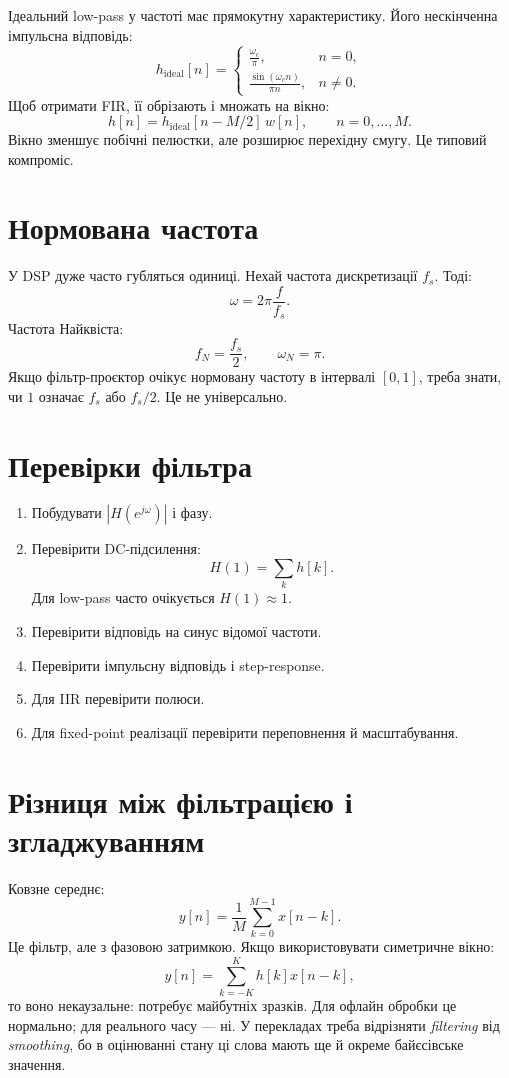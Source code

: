 Ідеальний low-pass у частоті має прямокутну характеристику. Його нескінченна імпульсна відповідь:
\[
h_{\mathrm{ideal}}[n]=
\begin{cases}
\frac{\omega_c}{\pi}, & n=0,\\
\frac{\sin(\omega_c n)}{\pi n}, & n\ne0.
\end{cases}
\]
Щоб отримати FIR, її обрізають і множать на вікно:
\[
h[n]=h_{\mathrm{ideal}}[n-M/2]\,w[n],\qquad n=0,\dots,M.
\]
Вікно зменшує побічні пелюстки, але розширює перехідну смугу. Це типовий компроміс.

\section{Нормована частота}

У DSP дуже часто губляться одиниці. Нехай частота дискретизації $f_s$. Тоді:
\[
\omega = 2\pi \frac{f}{f_s}.
\]
Частота Найквіста:
\[
f_N=\frac{f_s}{2},\qquad \omega_N=\pi.
\]
Якщо фільтр-проєктор очікує нормовану частоту в інтервалі $[0,1]$, треба знати, чи $1$ означає $f_s$ або $f_s/2$. Це не універсально.

\section{Перевірки фільтра}

\begin{enumerate}
\item Побудувати $|H(e^{j\omega})|$ і фазу.
\item Перевірити DC-підсилення:
\[
H(1)=\sum_k h[k].
\]
Для low-pass часто очікується $H(1)\approx1$.
\item Перевірити відповідь на синус відомої частоти.
\item Перевірити імпульсну відповідь і step-response.
\item Для IIR перевірити полюси.
\item Для fixed-point реалізації перевірити переповнення й масштабування.
\end{enumerate}

\section{Різниця між фільтрацією і згладжуванням}

Ковзне середнє:
\[
y[n]=\frac1M\sum_{k=0}^{M-1}x[n-k].
\]
Це фільтр, але з фазовою затримкою. Якщо використовувати симетричне вікно:
\[
y[n]=\sum_{k=-K}^{K}h[k]x[n-k],
\]
то воно некаузальне: потребує майбутніх зразків. Для офлайн обробки це нормально; для реального часу --- ні. У перекладах треба відрізняти \emph{filtering} від \emph{smoothing}, бо в оцінюванні стану ці слова мають ще й окреме байєсівське значення.

